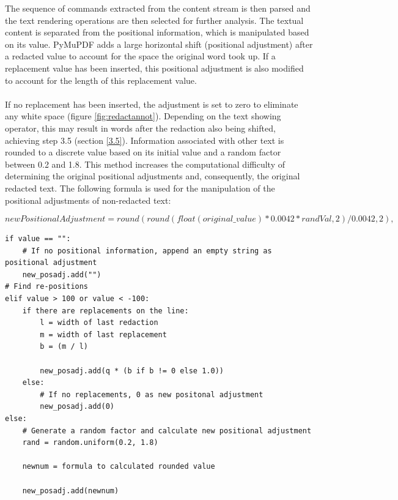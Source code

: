 The sequence of commands extracted from the content stream is then parsed and the text rendering operations are then selected for further analysis. The textual content is separated from the positional information, which is manipulated based on its value. PyMuPDF adds a large horizontal shift (positional adjustment) after a redacted value to account for the space the original word took up. If a replacement value has been inserted, this positional adjustment is also modified to account for the length of this replacement value.
\\\\
If no replacement has been inserted, the adjustment is set to zero to eliminate any white space (figure \ref{fig:redactannot}). Depending on the text showing operator, this may result in words after the redaction also being shifted, achieving step 3.5 (section \ref{3.5}). Information associated with other text is rounded to a discrete value based on its initial value and a random factor between 0.2 and 1.8. This method increases the computational difficulty of determining the original positional adjustments and, consequently, the original redacted text. The following formula is used for the manipulation of the positional adjustments of non-redacted text:

\[newPositionalAdjustment = round(round(float(original\_value) * 0.0042 * randVal, 2) / 0.0042, 2),\]

\begin{lstlisting}[style=CStyle, caption=Pseudocode for manipulating possible positional adjustments based on value. A really big or really small value may be found which indicates that PyMuPDF has inserted a new value after redaction. A new positional adjustment is calculated based on the last redaction and replacement value. Other values are rounded to the nearest discrete value based on the initial value and a random factor.]
if value == "":
    # If no positional information, append an empty string as positional adjustment
    new_posadj.add("")
# Find re-positions
elif value > 100 or value < -100:
    if there are replacements on the line:
        l = width of last redaction
        m = width of last replacement
        b = (m / l)

        new_posadj.add(q * (b if b != 0 else 1.0))
    else:
        # If no replacements, 0 as new positonal adjustment
        new_posadj.add(0)
else:
    # Generate a random factor and calculate new positional adjustment
    rand = random.uniform(0.2, 1.8)
    
    newnum = formula to calculated rounded value
    
    new_posadj.add(newnum)
\end{lstlisting}


